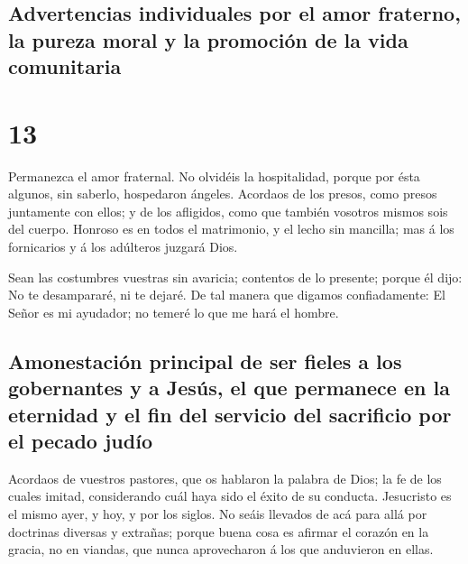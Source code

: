 \hypertarget{advertencias-individuales-por-el-amor-fraterno-la-pureza-moral-y-la-promociuxf3n-de-la-vida-comunitaria}{%
\subsection{Advertencias individuales por el amor fraterno, la pureza
moral y la promoción de la vida
comunitaria}\label{advertencias-individuales-por-el-amor-fraterno-la-pureza-moral-y-la-promociuxf3n-de-la-vida-comunitaria}}

\hypertarget{section-58-13}{%
\section{13}\label{section-58-13}}

 Permanezca el amor fraternal.  No olvidéis
la hospitalidad, porque por ésta algunos, sin saberlo, hospedaron
ángeles.  Acordaos de los presos, como presos juntamente
con ellos; y de los afligidos, como que también vosotros mismos sois del
cuerpo.  Honroso es en todos el matrimonio, y el lecho sin
mancilla; mas á los fornicarios y á los adúlteros juzgará Dios.

 Sean las costumbres vuestras sin avaricia; contentos de
lo presente; porque él dijo: No te desampararé, ni te dejaré.
 De tal manera que digamos confiadamente: El Señor es mi
ayudador; no temeré lo que me hará el hombre.

\hypertarget{amonestaciuxf3n-principal-de-ser-fieles-a-los-gobernantes-y-a-jesuxfas-el-que-permanece-en-la-eternidad-y-el-fin-del-servicio-del-sacrificio-por-el-pecado-juduxedo}{%
\subsection{Amonestación principal de ser fieles a los gobernantes y a
Jesús, el que permanece en la eternidad y el fin del servicio del
sacrificio por el pecado
judío}\label{amonestaciuxf3n-principal-de-ser-fieles-a-los-gobernantes-y-a-jesuxfas-el-que-permanece-en-la-eternidad-y-el-fin-del-servicio-del-sacrificio-por-el-pecado-juduxedo}}

 Acordaos de vuestros pastores, que os hablaron la palabra
de Dios; la fe de los cuales imitad, considerando cuál haya sido el
éxito de su conducta.  Jesucristo es el mismo ayer, y hoy,
y por los siglos.  No seáis llevados de acá para allá por
doctrinas diversas y extrañas; porque buena cosa es afirmar el corazón
en la gracia, no en viandas, que nunca aprovecharon á los que anduvieron
en ellas.

